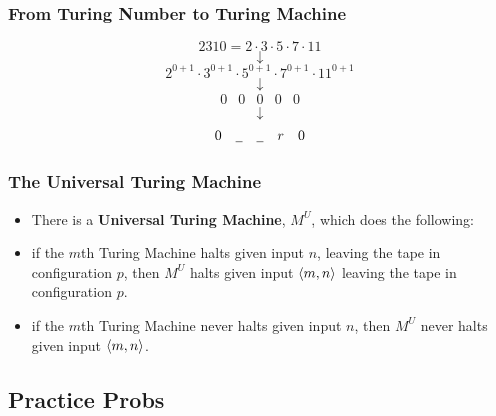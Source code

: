 \begin{frame}
\frametitle{From Turing Number to Turing Machine}

$$2310 = 2\cdot 3\cdot 5\cdot 7\cdot 11$$ \pause
$$\downarrow$$
$$ 2^{0+1}\cdot 3^{0+1}\cdot 5^{0+1}\cdot 7^{0+1}\cdot 11^{0+1}$$  \pause
$$\downarrow$$
\[
\begin{array}{ccccc}
0 & 0 & 0 &0 &0\end{array}
\]  \pause
$$\downarrow$$
\[
\begin{array}{ccccc}
0 &\underline{\enspace} &\underline{\enspace} &r &0\end{array}
\]
\end{frame}

\begin{frame}
\frametitle{The Universal Turing Machine}

\begin{itemize}[<+->]

\item There is a \textbf{Universal Turing Machine}, \(M^U\), which does the following:

\item if the \(m\)th Turing Machine halts given input \(n\), leaving the tape in configuration \(p\), then
     \(M^U\) halts given input \(\left\langle {m,n} \right\rangle\) leaving the tape in configuration \(p\).
     
     \item if the \(m\)th Turing Machine never halts given input $n$, then \(M^U\) never halts given input \(\left\langle {m,n} \right\rangle\).


\end{itemize}
\end{frame}


\subsection{Practice Probs}

